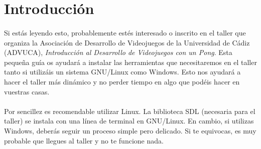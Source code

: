 \documentclass[16pt,spanish]{article}
\title{\titlename}
\author{\authorname}
\def \plpath{.}
\begin{document}









\section{Introducción}
\label{sec:intro}

\paragraph{}
Si estás leyendo esto, probablemente estés interesado o inscrito
en el taller que organiza la Asociación de Desarrollo de Videojuegos
de la Universidad de Cádiz (ADVUCA), \emph{Introducción al Desarrollo
de Videojuegos con un Pong}. Esta pequeña guía os ayudará a instalar
las herramientas que necesitaremos en el taller tanto si utilizáis
un sistema GNU/Linux como Windows. Esto nos ayudará a hacer el taller
más dinámico y no perder tiempo en algo que podéis hacer en vuestras casas.

\paragraph{}
Por sencillez es recomendable utilizar Linux. La biblioteca SDL (necesaria
para el taller) se instala con una línea de terminal en GNU/Linux.
En cambio, si utilizas Windows, deberás seguir un proceso simple pero delicado.
Si te equivocas, es muy probable que llegues al taller y no te funcione nada.
\end{document}
